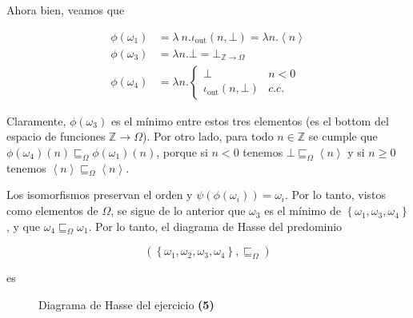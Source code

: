 \documentclass[a4paper, 12pt]{article}
\begin{document}
Ahora bien, veamos que 

\begin{align*}
  \phi(\omega_1) &= \lambda ~ n . \iota_{\text{out}}(n, \bot ) = \lambda n .
  \left<n \right>\\ 
  \phi(\omega_3) &= \lambda n.\bot  = \bot_{\mathbb{Z}\to \Omega}\\ 
  \phi(\omega_4) &= \lambda n .\begin{cases}
    \bot & n < 0 \\ 
    \iota_{\text{out}}(n, \bot ) & c.c.
  \end{cases}
\end{align*}

Claramente, $\phi(\omega_3)$ es el mínimo entre estos tres elementos (es el
bottom del espacio de funciones $\mathbb{Z} \to \Omega$). Por otro lado, para
todo $n \in \mathbb{Z}$ se cumple que $\phi(\omega_4)(n) \sqsubseteq_{\Omega}
\phi(\omega_1)(n)$, porque si $n < 0$ tenemos $\bot  \sqsubseteq_\Omega \left<n \right>$ y si $n \geq
0$ tenemos $\left<n \right> \sqsubseteq_\Omega \left<n \right>$. 

Los isomorfismos preservan el orden y
$\psi(\phi(\omega_i)) = \omega_i$. Por lo tanto, vistos como elementos de
$\Omega$, se sigue de lo anterior que $\omega_3$ es el mínimo de $\left\{
\omega_1, \omega_3, \omega_4 \right\} $, y que $\omega_4 \sqsubseteq_\Omega
\omega_1$. Por lo tanto, el diagrama de Hasse del predominio 

\begin{equation*}
  \left( \left\{ \omega_1, \omega_2, \omega_3, \omega_4 \right\}, \sqsubseteq_\Omega  \right) 
\end{equation*}

es



\begin{figure}[!h]
\centering
{}
\caption{Diagrama de Hasse del ejercicio \textbf{(5)}}
\end{figure} 
\end{document}
